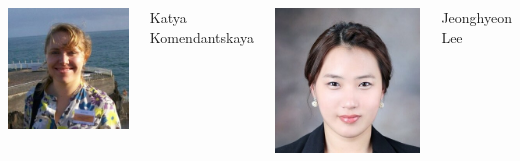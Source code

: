 \documentclass[t,compress,aspectratio=169]{beamer}
\begin{document}
\begin{frame}
\begin{columns}
	\includegraphics[width=\picwidth]{img/Katya3.jpg}
	\begin{block}
	{\centering\footnotesize{Katya Komendantskaya}}
    \end{block}
    
   	\vspace{-0.5em}
  	\includegraphics[width=\picwidth]{img/JL.jpeg}
	\begin{block}
	{\centering\footnotesize{Jeonghyeon Lee}}
   	\end{block}

   	\centering
   	\vspace{-1em}
   	

\end{columns}
\end{frame}
\end{document}
